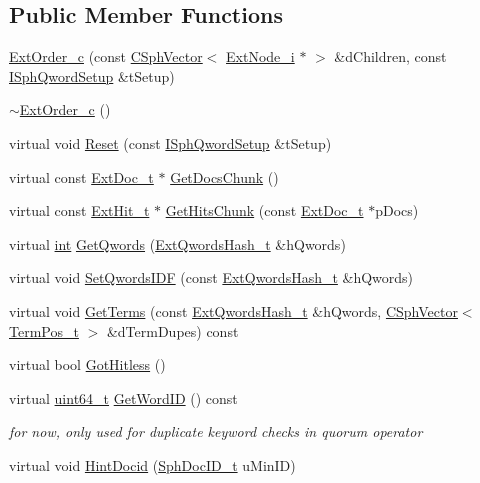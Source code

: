 \subsection*{Public Member Functions}
\begin{DoxyCompactItemize}
\item 
\hyperlink{classExtOrder__c_a6f04d452fb7d630d1b12090a2a6da021}{Ext\-Order\-\_\-c} (const \hyperlink{classCSphVector}{C\-Sph\-Vector}$<$ \hyperlink{classExtNode__i}{Ext\-Node\-\_\-i} $\ast$ $>$ \&d\-Children, const \hyperlink{classISphQwordSetup}{I\-Sph\-Qword\-Setup} \&t\-Setup)
\item 
\hyperlink{classExtOrder__c_aea3aa3c27cd160e7c3b1d387a6479c39}{$\sim$\-Ext\-Order\-\_\-c} ()
\item 
virtual void \hyperlink{classExtOrder__c_adbd038652f93288244e97c740e8d46d8}{Reset} (const \hyperlink{classISphQwordSetup}{I\-Sph\-Qword\-Setup} \&t\-Setup)
\item 
virtual const \hyperlink{structExtDoc__t}{Ext\-Doc\-\_\-t} $\ast$ \hyperlink{classExtOrder__c_adef31467ed869e713367f24ac0b2cddc}{Get\-Docs\-Chunk} ()
\item 
virtual const \hyperlink{structExtHit__t}{Ext\-Hit\-\_\-t} $\ast$ \hyperlink{classExtOrder__c_af43afa6dea69e69241bfb5d1c40e9cd1}{Get\-Hits\-Chunk} (const \hyperlink{structExtDoc__t}{Ext\-Doc\-\_\-t} $\ast$p\-Docs)
\item 
virtual \hyperlink{sphinxexpr_8cpp_a4a26e8f9cb8b736e0c4cbf4d16de985e}{int} \hyperlink{classExtOrder__c_ac96a96698d5680f47566978e21c193aa}{Get\-Qwords} (\hyperlink{sphinxsearch_8cpp_a814fc096e1ffb29d072d79b72b702fe6}{Ext\-Qwords\-Hash\-\_\-t} \&h\-Qwords)
\item 
virtual void \hyperlink{classExtOrder__c_ae35ffdf3377ff2bcb7f1b93c7b9e5fcf}{Set\-Qwords\-I\-D\-F} (const \hyperlink{sphinxsearch_8cpp_a814fc096e1ffb29d072d79b72b702fe6}{Ext\-Qwords\-Hash\-\_\-t} \&h\-Qwords)
\item 
virtual void \hyperlink{classExtOrder__c_a1699d407c6a6c9ad458d1686fa2a554f}{Get\-Terms} (const \hyperlink{sphinxsearch_8cpp_a814fc096e1ffb29d072d79b72b702fe6}{Ext\-Qwords\-Hash\-\_\-t} \&h\-Qwords, \hyperlink{classCSphVector}{C\-Sph\-Vector}$<$ \hyperlink{structTermPos__t}{Term\-Pos\-\_\-t} $>$ \&d\-Term\-Dupes) const 
\item 
virtual bool \hyperlink{classExtOrder__c_ae9c21d02dd87761d6dadeb76bfa738b9}{Got\-Hitless} ()
\item 
virtual \hyperlink{sphinxstd_8h_aaa5d1cd013383c889537491c3cfd9aad}{uint64\-\_\-t} \hyperlink{classExtOrder__c_a2d88f024cefb5d8ea557825f1c2849f8}{Get\-Word\-I\-D} () const 
\begin{DoxyCompactList}\small\item\em for now, only used for duplicate keyword checks in quorum operator \end{DoxyCompactList}\item 
virtual void \hyperlink{classExtOrder__c_a778cf31660ff3cdaa4dd51b609ca7e5a}{Hint\-Docid} (\hyperlink{sphinx_8h_a3176771631c12a9e4897272003e6b447}{Sph\-Doc\-I\-D\-\_\-t} u\-Min\-I\-D)
\end{DoxyCompactItemize}

